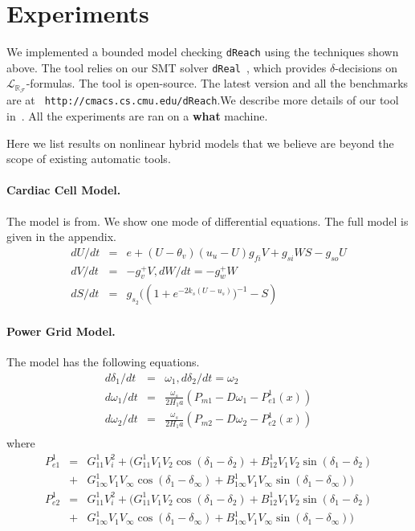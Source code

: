 \documentclass[envcountsect]{llncs}
\newcommand{\lrf}{\mathcal{L}_{\mathbb{R}_{\mathcal{F}}}}
\begin{document}
\section{Experiments}\label{experiments}

We implemented a bounded model checking {\tt dReach} using the
techniques shown above. The tool relies on our SMT solver {\tt dReal}~\cite{},
which provides $\delta$-decisions on $\lrf$-formulas. The tool is
open-source. The latest version and all the benchmarks are at {\tt
http://cmacs.cs.cmu.edu/dReach}.We describe more details of our tool in~\cite{}.
All the experiments are ran on a {\bf what} machine. 

Here we list results on nonlinear hybrid models that we believe are
beyond the scope of existing automatic tools. 

\paragraph{Cardiac Cell Model.} The model is from. We show one mode of
differential equations. The full model is given in the appendix. 
\begin{eqnarray*}
dU/dt &=& e  + ( U - \theta_v)(u_u - U)g_{fi}V + g_{si}WS-g_{so}U\\
dV/dt &=& -g_v^+ V, dW/dt = -g_w^+ W\\
dS/dt &=& g_{s_2} (({1+e^{-2k_s(U-u_s)})^{-1}}-S)
\end{eqnarray*}

\paragraph{Power Grid Model.} The model has the following equations. 
\begin{eqnarray*}
d\delta_1/dt &=& \omega_1, d\delta_2/dt = \omega_2 \\
d\omega_1/dt &=& \frac{\omega_s}{2H_1a}(P_{m1} - D\omega_1 - P_{e1}^1(x))\\
d\omega_2/dt &=& \frac{\omega_s}{2H_1a}(P_{m2} - D\omega_2 - P_{e2}^1(x))\\
\end{eqnarray*}
where
\begin{eqnarray*}
P_{e1}^1 &=& G_{11}^1V_i^2 + \Big(G_{11}^1 V_1V_2\cos(\delta_1-\delta_2) +
B_{12}^1 V_1V_2\sin(\delta_1-\delta_2)\\
&+& G_{1\infty}^1
V_1V_{\infty}\cos(\delta_1-\delta_{\infty}) + B_{1\infty}^1
V_1V_{\infty}\sin(\delta_1-\delta_{\infty}) \Big)\\
P_{e2}^1 &=& G_{11}^1V_i^2 + \Big(G_{11}^1 V_1V_2\cos(\delta_1-\delta_2) +
B_{12}^1 V_1V_2\sin(\delta_1-\delta_2)\\
&+& G_{1\infty}^1
V_1V_{\infty}\cos(\delta_1-\delta_{\infty}) + B_{1\infty}^1
V_1V_{\infty}\sin(\delta_1-\delta_{\infty}) \Big)
\end{eqnarray*}
\end{document}
